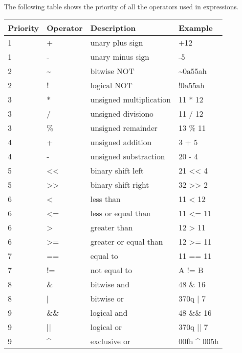     The following table shows the priority of all the operators used in expressions.

    \begin{table}[h!]
        \centering{}
        \mysmallfont{}

        \begin{tabular}{|l|l|l|l|}
            \hline
            Priority & Operator & Description             & Example         \\\hline
            1        & +        & unary plus sign         & +12             \\\hline
            1        & -        & unary minus sign        & -5              \\\hline
            2        & \~{}     & bitwise NOT             & \~{}0a55ah      \\\hline
            2        & !        & logical NOT             & !0a55ah         \\\hline
            3        & *        & unsigned multiplication & 11 * 12         \\\hline
            3        & /        & unsigned divisiono      & 11 / 12         \\\hline
            3        & \%       & unsigned remainder      & 13 \% 11        \\\hline
            4        & +        & unsigned addition       & 3 + 5           \\\hline
            4        & -        & unsigned substraction   & 20 - 4          \\\hline
            5        & <{}<     & binary shift left       & 21 <{}< 4       \\\hline
            5        & >{}>     & binary shift right      & 32 >{}> 2       \\\hline
            6        & <        & less than               & 11 < 12         \\\hline
            6        & <=       & less or equal than      & 11 <= 11        \\\hline
            6        &  >       & greater than            & 12 > 11         \\\hline
            6        & >=       & greater or equal than   & 12 >= 11        \\\hline
            7        & ==       & equal to                & 11 == 11        \\\hline
            7        & !=       & not equal to            &  A != B         \\\hline
            8        & \&       & bitwise and             & 48 \& 16        \\\hline
            8        & |        & bitwise or              & 370q | 7        \\\hline
            9        & \&\&     & logical and             & 48 \&\& 16      \\\hline
            9        & ||       & logical or              & 370q || 7       \\\hline
            9        & \^{}     & exclusive or            & 00fh \^{} 005h  \\\hline
        \end{tabular}


\end{table}
